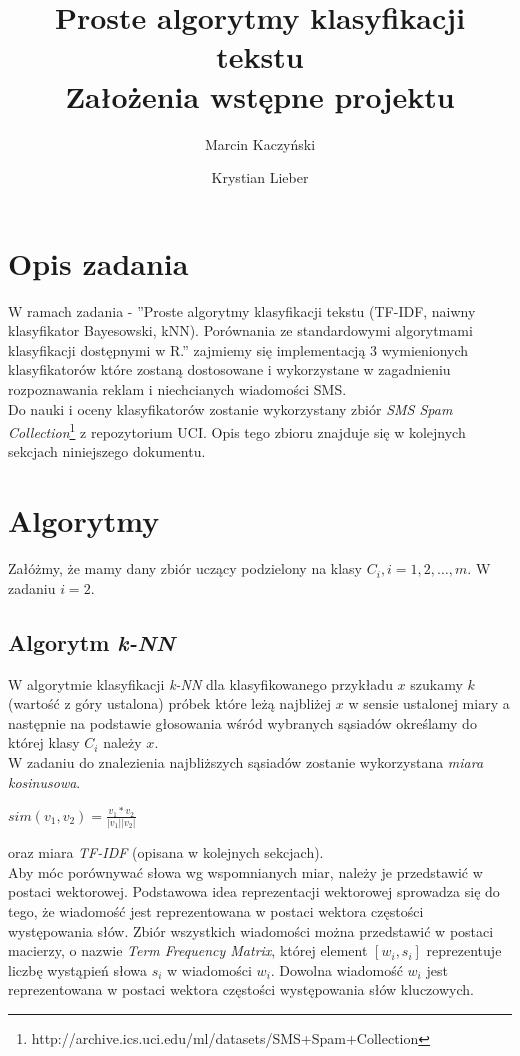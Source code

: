 \documentclass[a4paper,12pt]{article}
\title{Proste algorytmy klasyfikacji tekstu \\ Założenia wstępne projektu}
\author{Marcin Kaczyński \and Krystian Lieber}
\begin{document}
\maketitle

\section{Opis zadania} 

W ramach zadania - ''Proste algorytmy klasyfikacji tekstu (TF-IDF, naiwny klasyfikator Bayesowski, kNN). Porównania ze standardowymi algorytmami klasyfikacji dostępnymi w R.'' zajmiemy się implementacją 3 wymienionych klasyfikatorów które zostaną dostosowane i wykorzystane w zagadnieniu rozpoznawania reklam i niechcianych wiadomości SMS.\\

Do nauki i oceny klasyfikatorów zostanie wykorzystany zbiór \textit{SMS Spam Collection}\footnote{http://archive.ics.uci.edu/ml/datasets/SMS+Spam+Collection} z repozytorium UCI. Opis tego zbioru znajduje się w kolejnych sekcjach niniejszego dokumentu.

\section{Algorytmy}

Załóżmy, że mamy dany zbiór uczący podzielony na klasy $C_i, i = 1, 2, \dots, m$. W zadaniu $i=2$. 

\subsection{Algorytm \textit{k-NN}}

W algorytmie klasyfikacji \textit{k-NN} dla klasyfikowanego przykładu $x$ szukamy $k$ (wartość z góry ustalona) próbek które leżą najbliżej $x$ w sensie ustalonej miary a następnie na podstawie głosowania wśród wybranych sąsiadów określamy do której klasy $C_i$ należy $x$.\\

W zadaniu do znalezienia najbliższych sąsiadów zostanie wykorzystana \textit{miara kosinusowa}.

\begin{center}
$sim(v_1, v_2) = \frac{v_1*v_2}{|v_1||v_2|}$
\end{center}

oraz miara \textit{TF-IDF} (opisana w kolejnych sekcjach).\\

Aby móc porównywać słowa wg wspomnianych miar, należy je przedstawić w postaci wektorowej. Podstawowa idea reprezentacji wektorowej sprowadza się do tego, że wiadomość jest reprezentowana w postaci wektora częstości występowania słów. Zbiór wszystkich wiadomości można przedstawić w postaci macierzy, o nazwie \textit{Term Frequency Matrix}, której element $[w_i, s_i]$ reprezentuje liczbę wystąpień słowa $s_i$ w wiadomości $w_i$. Dowolna wiadomość $w_i$ jest reprezentowana w postaci wektora częstości występowania słów kluczowych.
\end{document}
